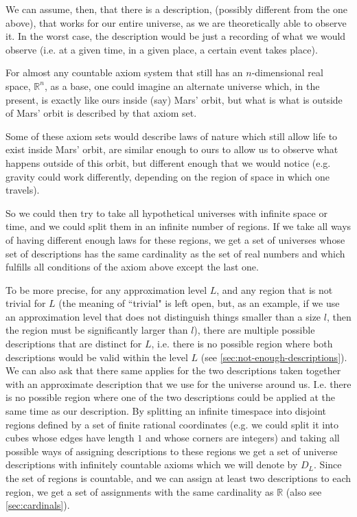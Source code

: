 \documentclass[a4paper
]{article}
\def\reale{\mathbb{R}}
\def\descriptions{D_L}
\newcommand{\ghilimele}[1]{``#1"}
\begin{document}
We can assume, then, that there is a description,
(possibly different from the one above), that works for our entire universe,
as we are theoretically able to observe it. In the worst case, the description
would be just a recording of what we would observe (i.e. at a given time, in
a given place, a certain event takes place).

For almost any countable axiom system that still
has an $n$-dimensional real space, $\reale^n$, as a base,
one could imagine an alternate universe
which, in the present, is exactly like ours inside (say) Mars' orbit,
but what is what is outside of Mars' orbit is described by that axiom set.

Some of these axiom sets would describe laws of nature which still allow life
to exist inside Mars' orbit, are similar enough
to ours to allow us to observe what happens outside of this orbit,
but different enough that
we would notice (e.g. gravity could work differently, depending on the region
of space in which one travels).

So we could then try to take all hypothetical universes with infinite space
or time, and we could split them in an infinite number of regions. If we take
all ways of having different enough laws for these regions,
we get a set of universes whose set of descriptions has the same cardinality
as the set of real numbers and which fulfills all conditions of the axiom
above except the last one.

To be more precise, for any approximation level $L$, and any region that
is not trivial for $L$
(the meaning of \ghilimele{trivial} is left open, but, as an example,
if we use an approximation level that does not distinguish things smaller
than a size $l$, then the region must be significantly larger than $l$),
there are multiple possible descriptions that
are distinct for $L$, i.e. there is no possible region where both descriptions
would be valid within the level $L$ (see \ref{sec:not-enough-descriptions}).
We can also ask that there same applies for the two descriptions taken together
with an approximate description that we use for the universe around us.
I.e. there is no possible region where one of the two descriptions could
be applied at the same time as our description.
By splitting an infinite timespace
into disjoint regions defined by a set of finite rational coordinates
(e.g. we could split it into cubes whose edges have length $1$ and whose
corners are integers)
and taking all possible ways of assigning descriptions to these regions
we get a set of universe descriptions with infinitely countable axioms
which we will denote by $\descriptions$.
Since the set of regions is countable, and we can assign at least two
descriptions to each region, we get a set of assignments with the same
cardinality as $\reale$ (also see \ref{sec:cardinals}).
\end{document}
